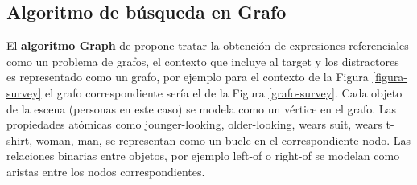 \subsection{Algoritmo de b\'usqueda en Grafo}
\label{graph}

%





El {\bf algoritmo Graph} de \cite{Krahmer:2003} propone tratar la obtenci\'on de expresiones referenciales como un problema de grafos, el contexto que incluye al target y los distractores es representado como un grafo, por ejemplo para el contexto de la Figura \ref{figura-survey} el grafo correspondiente ser\'ia el de la Figura \ref{grafo-survey}. Cada objeto de la escena (personas en este caso) se modela como un v\'ertice en el grafo. Las propiedades at\'omicas como jounger-looking, older-looking, wears suit, wears t-shirt, woman, man, se representan como un bucle en el correspondiente nodo. Las relaciones binarias entre objetos, por ejemplo left-of o right-of se modelan como aristas entre los nodos correspondientes.

